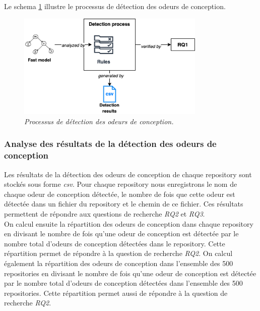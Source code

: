 Le schema \ref{fig:detection} illustre le processus de détection des odeurs de conception.\\


\begin{figure}[h]
  \centering
  \includegraphics[width=0.8\textwidth]{figure/design_smell_detection.png}
  \caption{\emph{Processus de détection des odeurs de conception.}}
  \label{fig:detection}
\end{figure}

\subsubsection{Analyse des résultats de la détection des odeurs de conception}
\label{sec:Analyse des résultats de la détection des odeurs de conception}
Les résultats de la détection des odeurs de conception de chaque repository sont
stockés sous forme \emph{csv}. Pour chaque repository nous enregistrons le nom de
chaque odeur de conception détectée, le nombre de fois que cette odeur est
détectée dans un fichier du repository et le chemin de ce fichier. Ces résultats
permettent de répondre aux questions de recherche \emph{RQ2} et \emph{RQ3}.\\
On calcul ensuite la répartition des odeurs de conception dans chaque repository
en divisant le nombre de fois qu'une odeur de conception est détectée par le
nombre total d'odeurs de conception détectées dans le repository. Cette
répartition permet de répondre à la question de recherche \emph{RQ2}. On
calcul également la répartition des odeurs de conception dans l'ensemble des 500
repositories en divisant le nombre de fois qu'une odeur de conception est
détectée par le nombre total d'odeurs de conception détectées dans l'ensemble
des 500 repositories. Cette répartition permet aussi de répondre à la
question de recherche \emph{RQ2}.\\

